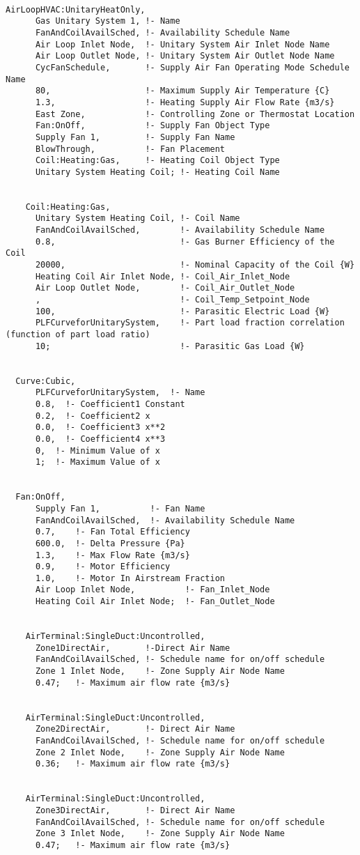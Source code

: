 \begin{lstlisting}

AirLoopHVAC:UnitaryHeatOnly,
      Gas Unitary System 1, !- Name
      FanAndCoilAvailSched, !- Availability Schedule Name
      Air Loop Inlet Node,  !- Unitary System Air Inlet Node Name
      Air Loop Outlet Node, !- Unitary System Air Outlet Node Name
      CycFanSchedule,       !- Supply Air Fan Operating Mode Schedule Name
      80,                   !- Maximum Supply Air Temperature {C}
      1.3,                  !- Heating Supply Air Flow Rate {m3/s}
      East Zone,            !- Controlling Zone or Thermostat Location
      Fan:OnOff,            !- Supply Fan Object Type
      Supply Fan 1,         !- Supply Fan Name
      BlowThrough,          !- Fan Placement
      Coil:Heating:Gas,     !- Heating Coil Object Type
      Unitary System Heating Coil; !- Heating Coil Name


    Coil:Heating:Gas,
      Unitary System Heating Coil, !- Coil Name
      FanAndCoilAvailSched,        !- Availability Schedule Name
      0.8,                         !- Gas Burner Efficiency of the Coil
      20000,                       !- Nominal Capacity of the Coil {W}
      Heating Coil Air Inlet Node, !- Coil_Air_Inlet_Node
      Air Loop Outlet Node,        !- Coil_Air_Outlet_Node
      ,                            !- Coil_Temp_Setpoint_Node
      100,                         !- Parasitic Electric Load {W}
      PLFCurveforUnitarySystem,    !- Part load fraction correlation (function of part load ratio)
      10;                          !- Parasitic Gas Load {W}


  Curve:Cubic,
      PLFCurveforUnitarySystem,  !- Name
      0.8,  !- Coefficient1 Constant
      0.2,  !- Coefficient2 x
      0.0,  !- Coefficient3 x**2
      0.0,  !- Coefficient4 x**3
      0,  !- Minimum Value of x
      1;  !- Maximum Value of x


  Fan:OnOff,
      Supply Fan 1,          !- Fan Name
      FanAndCoilAvailSched,  !- Availability Schedule Name
      0.7,    !- Fan Total Efficiency
      600.0,  !- Delta Pressure {Pa}
      1.3,    !- Max Flow Rate {m3/s}
      0.9,    !- Motor Efficiency
      1.0,    !- Motor In Airstream Fraction
      Air Loop Inlet Node,          !- Fan_Inlet_Node
      Heating Coil Air Inlet Node;  !- Fan_Outlet_Node


    AirTerminal:SingleDuct:Uncontrolled,
      Zone1DirectAir,       !-Direct Air Name
      FanAndCoilAvailSched, !- Schedule name for on/off schedule
      Zone 1 Inlet Node,    !- Zone Supply Air Node Name
      0.47;   !- Maximum air flow rate {m3/s}


    AirTerminal:SingleDuct:Uncontrolled,
      Zone2DirectAir,       !- Direct Air Name
      FanAndCoilAvailSched, !- Schedule name for on/off schedule
      Zone 2 Inlet Node,    !- Zone Supply Air Node Name
      0.36;   !- Maximum air flow rate {m3/s}


    AirTerminal:SingleDuct:Uncontrolled,
      Zone3DirectAir,       !- Direct Air Name
      FanAndCoilAvailSched, !- Schedule name for on/off schedule
      Zone 3 Inlet Node,    !- Zone Supply Air Node Name
      0.47;   !- Maximum air flow rate {m3/s}
\end{lstlisting}


